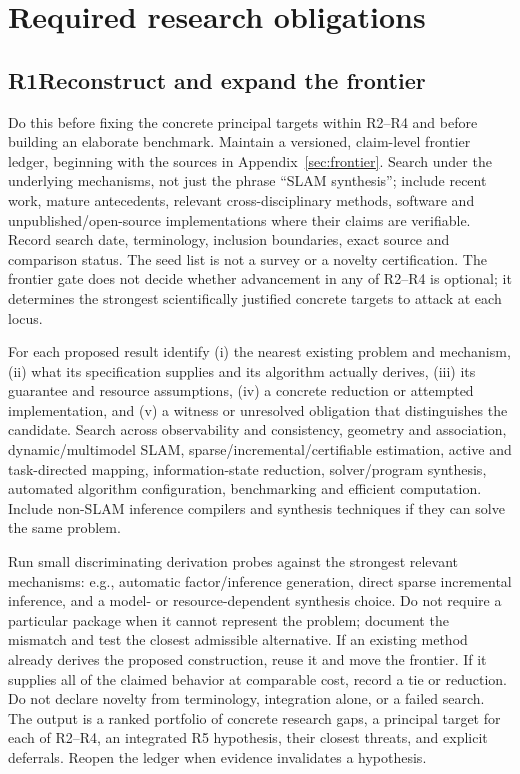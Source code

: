 \documentclass[11pt,letterpaper]{article}
\newcommand{\req}[2]{\subsection*{#1\enspace #2}\addcontentsline{toc}{subsection}{#1\space #2}}
\begin{document}
\section{Required research obligations}
\req{R1}{Reconstruct and expand the frontier}
Do this before fixing the concrete principal targets within R2--R4 and before building an elaborate benchmark. Maintain a versioned, claim-level frontier ledger, beginning with the sources in Appendix~\ref{sec:frontier}. Search under the underlying mechanisms, not just the phrase ``SLAM synthesis''; include recent work, mature antecedents, relevant cross-disciplinary methods, software and unpublished/open-source implementations where their claims are verifiable. Record search date, terminology, inclusion boundaries, exact source and comparison status. The seed list is not a survey or a novelty certification. The frontier gate does not decide whether advancement in any of R2--R4 is optional; it determines the strongest scientifically justified concrete targets to attack at each locus.

For each proposed result identify (i) the nearest existing problem and mechanism, (ii) what its specification supplies and its algorithm actually derives, (iii) its guarantee and resource assumptions, (iv) a concrete reduction or attempted implementation, and (v) a witness or unresolved obligation that distinguishes the candidate. Search across observability and consistency, geometry and association, dynamic/multimodel SLAM, sparse/incremental/certifiable estimation, active and task-directed mapping, information-state reduction, solver/program synthesis, automated algorithm configuration, benchmarking and efficient computation. Include non-SLAM inference compilers and synthesis techniques if they can solve the same problem.

Run small discriminating derivation probes against the strongest relevant mechanisms: e.g., automatic factor/inference generation, direct sparse incremental inference, and a model- or resource-dependent synthesis choice. Do not require a particular package when it cannot represent the problem; document the mismatch and test the closest admissible alternative. If an existing method already derives the proposed construction, reuse it and move the frontier. If it supplies all of the claimed behavior at comparable cost, record a tie or reduction. Do not declare novelty from terminology, integration alone, or a failed search. The output is a ranked portfolio of concrete research gaps, a principal target for each of R2--R4, an integrated R5 hypothesis, their closest threats, and explicit deferrals. Reopen the ledger when evidence invalidates a hypothesis.
\end{document}
